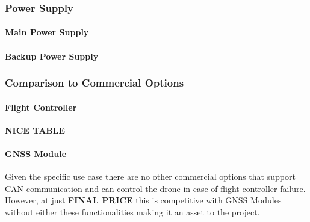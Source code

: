 \subsubsection{Power Supply}
\paragraph{Main Power Supply}
\paragraph{Backup Power Supply}

\subsubsection{Comparison to Commercial Options}
\paragraph{Flight Controller}
\textbf{NICE TABLE}
\paragraph{\gls{GNSS} Module}
Given the specific use case there are no other commercial options that support \gls{CAN} communication and can control the drone in case of flight controller failure. However, at just \textbf{FINAL PRICE} this is competitive with GNSS Modules without either these functionalities making it an asset to the project.

